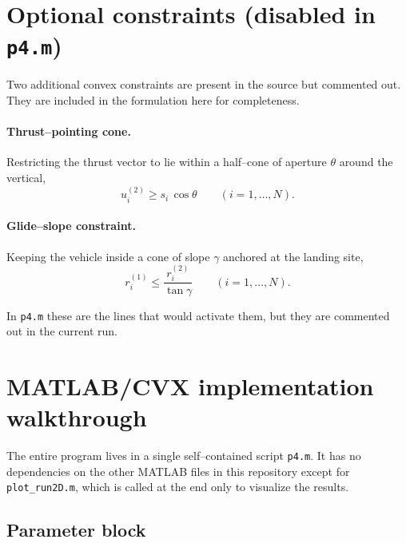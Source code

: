 \documentclass[11pt]{article}
\begin{document}
\section{Optional constraints (disabled in \texttt{p4.m})}

Two additional convex constraints are present in the source but
commented out.  They are included in the formulation here for
completeness.

\paragraph{Thrust--pointing cone.}
Restricting the thrust vector to lie within a half--cone of
aperture $\theta$ around the vertical,
\begin{equation}
u_i^{(2)} \ge s_i\,\cos\theta
\qquad (i=1,\dots,N) .
\label{eq:pointing}
\end{equation}

\paragraph{Glide--slope constraint.}
Keeping the vehicle inside a cone of slope $\gamma$ anchored at
the landing site,
\begin{equation}
r_i^{(1)} \le \frac{r_i^{(2)}}{\tan\gamma}
\qquad (i=1,\dots,N) .
\label{eq:glideslope}
\end{equation}

In \texttt{p4.m} these are the lines that would activate them, but
they are commented out in the current run.

\section{MATLAB/CVX implementation walkthrough}

The entire program lives in a single self--contained script
\texttt{p4.m}.  It has no dependencies on the other MATLAB files in
this repository except for \texttt{plot\_run2D.m}, which is called
at the end only to visualize the results.

\subsection{Parameter block}
\end{document}
